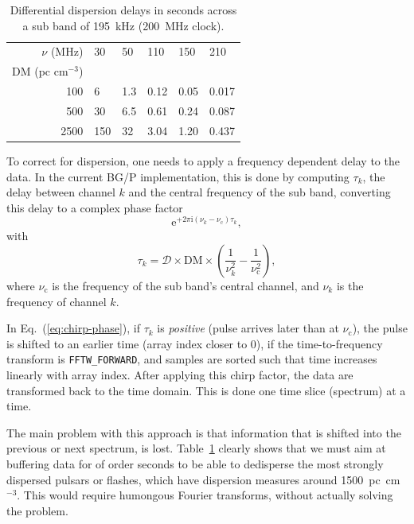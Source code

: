 \documentclass[a4paper,twoside]{article}
\newcommand{\bgp}{BG/P\xspace}
\newcommand{\dm}{\mathrm{DM}}
\newcommand{\fftwforward}{\texttt{FFTW\_FORWARD}\xspace}
\begin{document}
\begin{table}
\caption{Differential dispersion delays in seconds across a sub
  band of 195~kHz (200~MHz clock).}
\label{tab:differential-delays}
\begin{center}
\begin{tabular}{r|lllll}
\hline
\hline
$\nu$ (MHz)& 30 & 50  & 110  & 150  & 210 \\
DM (pc cm$^{-3}$) \\
\hline
100        &  6  & 1.3 & 0.12 & 0.05 & 0.017\\
500        &  30 & 6.5 & 0.61 & 0.24 & 0.087\\
2500       & 150 & 32  & 3.04 & 1.20 & 0.437\\
\hline
\hline
\end{tabular}
\end{center}
\end{table}

To correct for dispersion, one needs to apply a frequency dependent
delay to the data. In the current \bgp implementation, this is done by
computing $\tau_k$, the delay between channel $k$ and the central
frequency of the sub band, converting this delay to a complex phase
factor
\begin{equation}
\mathrm{e}^{+2\pi\mathrm{i}(\nu_k-\nu_\mathrm{c})\tau_k},
\label{eq:chirp-phase}
\end{equation}
with
\begin{equation}
\tau_k =  \mathcal{D} \times \dm \times\left(\frac{1}{\nu_k^2}  -
\frac{1}{\nu_\mathrm{c}^2}\right),
\label{eq:channel-dispersion-delay}
\end{equation}
where $\nu_\mathrm{c}$ is the frequency of the sub band's central
channel, and $\nu_k$ is the frequency of channel $k$.

In Eq.~(\ref{eq:chirp-phase}), if $\tau_k$ is \emph{positive} (pulse
arrives later than at $\nu_\mathrm{c}$), the pulse is shifted to an
earlier time (array index closer to 0), if the time-to-frequency
transform is \fftwforward, and samples are sorted such that time
increases linearly with array index. After applying this chirp factor,
the data are transformed back to the time domain. This is done one
time slice (spectrum) at a time.

The main problem with this approach is that information that is
shifted into the previous or next spectrum, is
lost. Table~\ref{tab:differential-delays} clearly shows that we must
aim at buffering data for of order seconds to be able to dedisperse
the most strongly dispersed pulsars or flashes, which have dispersion
measures around 1500~pc~cm$^{-3}$. This would require humongous
Fourier transforms, without actually solving the problem.
\end{document}
